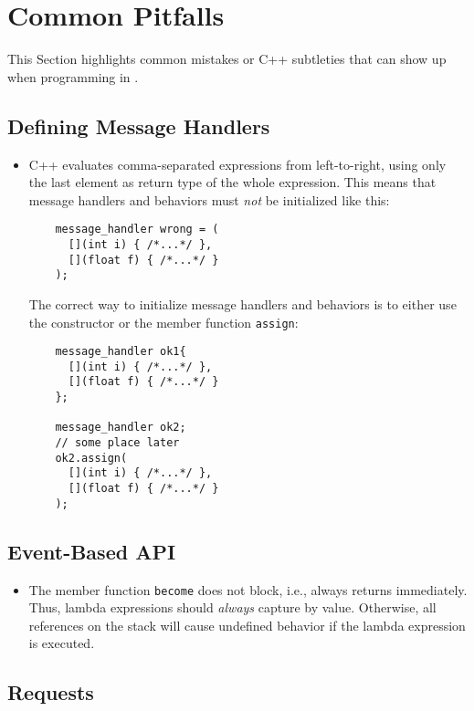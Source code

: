\section{Common Pitfalls}
\label{pitfalls}

This Section highlights common mistakes or C++ subtleties that can show up when
programming in \lib.

\subsection{Defining Message Handlers}

\begin{itemize}
\item C++ evaluates comma-separated expressions from left-to-right, using only
  the last element as return type of the whole expression. This means that
    message handlers and behaviors must \emph{not} be initialized like this:
    \begin{lstlisting}
    message_handler wrong = (
      [](int i) { /*...*/ },
      [](float f) { /*...*/ }
    );
    \end{lstlisting}
    The correct way to initialize message handlers and behaviors is to either
    use the constructor or the member function \lstinline^assign^:
    \begin{lstlisting}
    message_handler ok1{
      [](int i) { /*...*/ },
      [](float f) { /*...*/ }
    };

    message_handler ok2;
    // some place later
    ok2.assign(
      [](int i) { /*...*/ },
      [](float f) { /*...*/ }
    );
    \end{lstlisting}
\end{itemize}

\subsection{Event-Based API}

\begin{itemize}
\item The member function \lstinline^become^ does not block, i.e., always
  returns immediately. Thus, lambda expressions should \textit{always} capture
    by value. Otherwise, all references on the stack will cause undefined
    behavior if the lambda expression is executed.
\end{itemize}

\subsection{Requests}


